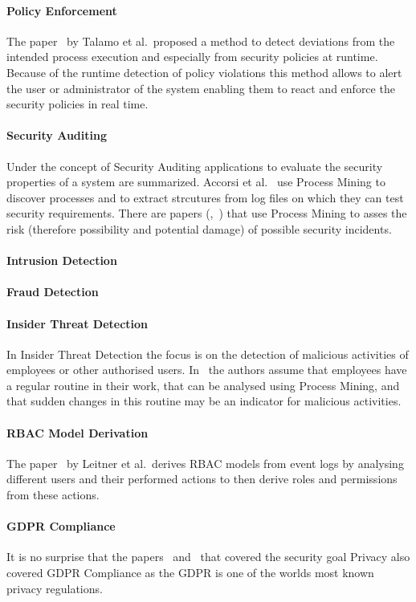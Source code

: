 \documentclass[runningheads]{llncs}
\begin{document}
\paragraph{Policy Enforcement} The paper~\cite{Talamo2013} by Talamo et al.\ proposed a method to detect deviations from the intended process execution and especially from security policies at runtime. Because of the runtime detection of policy violations this
method allows to alert the user or administrator of the system enabling them to react and enforce the security policies in real time.
\paragraph{Security Auditing} Under the concept of Security Auditing applications to evaluate the security properties of a system are summarized. Accorsi et al.~\cite{Accorsi20131462} use Process Mining to discover processes and to extract strcutures from log files
on which they can test security requirements. There are papers (\cite{Yunizal20221387},~\cite{Dedousis202235}) that use Process Mining to asses the risk (therefore possibility and potential damage) of possible security incidents.
\paragraph{Intrusion Detection}
\paragraph{Fraud Detection}
\paragraph{Insider Threat Detection} In Insider Threat Detection the focus is on the detection of malicious activities of employees or other authorised users. In~\cite{MacAk2020} the authors assume that employees have a regular routine in their work, that can be
analysed using Process Mining, and that sudden changes in this routine may be an indicator for malicious activities.
\paragraph{RBAC Model Derivation} The paper~\cite{Leitner2013719} by Leitner et al.\ derives RBAC models from event logs by analysing different users and their performed actions to then derive roles and permissions from these actions.
\paragraph{GDPR Compliance} It is no surprise that the papers~\cite{Zaman20192982} and~\cite{MozafariMehr202182} that covered the security goal Privacy also covered GDPR Compliance as the GDPR is one of the worlds most known privacy regulations.
\end{document}
